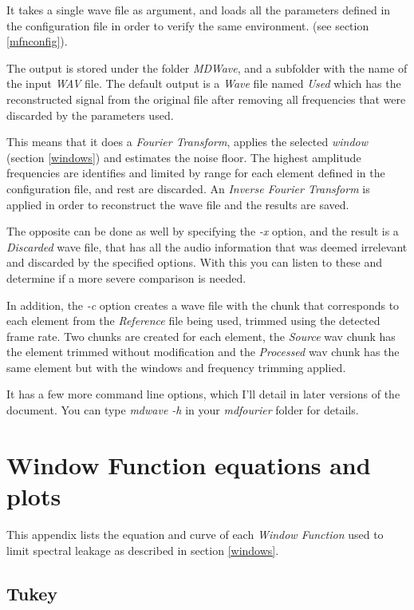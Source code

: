 \documentclass[10pt,a4paper]{report}
\begin{document}
\begin{appendices}
It takes a single wave file as argument, and loads all the parameters defined in the configuration file in order to verify the same environment. (see section \ref{mfnconfig}).

The output is stored under the folder \textit{MDWave}, and a subfolder with the name of the input \textit{WAV} file. The default output is a \textit{Wave} file named \textit{Used} which has the reconstructed signal from the original file after removing all frequencies that were discarded by the parameters used.

This means that it does a \textit{Fourier Transform}, applies the selected \textit{window} (section \ref{windows}) and estimates the noise floor. The highest amplitude frequencies are identifies and limited by range for each element defined in the configuration file, and rest are discarded. An \textit{Inverse Fourier Transform} is applied in order to reconstruct the wave file and the results are saved.

The opposite can be done as well by specifying the \textit{-x} option, and the result is a \textit{Discarded} wave file, that has all the audio information that was deemed irrelevant and discarded by the specified options. With this you can listen to these and determine if a more severe comparison is needed.

In addition, the \textit{-c} option creates a wave file with the chunk that corresponds to each element from the \textit{Reference} file being used, trimmed using the detected frame rate. Two chunks are created for each element, the \textit{Source} wav chunk has the element trimmed without modification and the \textit{Processed} wav chunk has the same element but with the windows and frequency trimming applied.

It has a few more command line options, which I'll detail in later versions of the document. You can type \textit{mdwave -h} in your \textit{mdfourier} folder for details.

\chapter{Window Function equations and plots}
\label{windowfunctiondetails}

This appendix lists the equation and curve of each \textit{Window Function} used to limit spectral leakage as described in section \ref{windows}.

\newpage
\section{Tukey}


\end{appendices}
\end{document}
